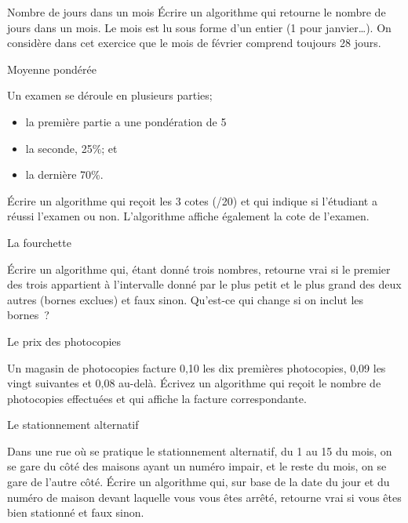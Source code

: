 		\begin{Exercice}{Nombre de jours dans un mois}
			Écrire un algorithme qui retourne le nombre de jours dans un mois. 
			Le mois est lu sous forme d’un entier (1 pour janvier\dots).
			On considère dans cet exercice que le mois de février
			comprend toujours 28 jours.
		\end{Exercice}

		\begin{Exercice}{Moyenne pondérée}

			Un examen se déroule en plusieurs parties;
			\begin{itemize}
				\item la première partie a une pondération de 5%
				\item la seconde, 25\%; et
				\item la dernière 70\%.
			\end{itemize}
			Écrire un algorithme qui reçoit les 3 cotes (/20) et qui indique
			si l'étudiant a réussi l'examen ou non. L'algorithme affiche également
			la cote de l'examen. 
		\end{Exercice}	


		\begin{Exercice}{La fourchette}

			Écrire un algorithme qui, étant donné trois nombres, 
			retourne vrai si le premier des trois 
			appartient à l’intervalle donné par le plus petit et le plus grand 
			des deux autres (bornes exclues) et faux sinon. 
			Qu’est-ce qui change si on inclut les bornes~?
		\end{Exercice}

		\begin{Exercice}{Le prix des photocopies}

			Un magasin de photocopies facture 0,10 \texteuro{} 
			les dix premières photocopies, 
			0,09 \texteuro{} les vingt suivantes 
			et 0,08 \texteuro{} au-delà. 
			Écrivez un algorithme 
			qui reçoit le nombre de photocopies effectuées 
			et qui affiche la facture correspondante.
		\end{Exercice}

		\begin{Exercice}{Le stationnement alternatif}

			Dans une rue où se pratique le stationnement alternatif, du 1 au 15
			du mois, on se gare du côté des maisons ayant un numéro impair, et
			le reste du mois, on se gare de l’autre côté.  Écrire un algorithme
			qui, sur base de la date du jour et du numéro de maison devant
			laquelle vous vous êtes arrêté, retourne vrai si vous êtes bien
			stationné et faux sinon.  \end{Exercice}




